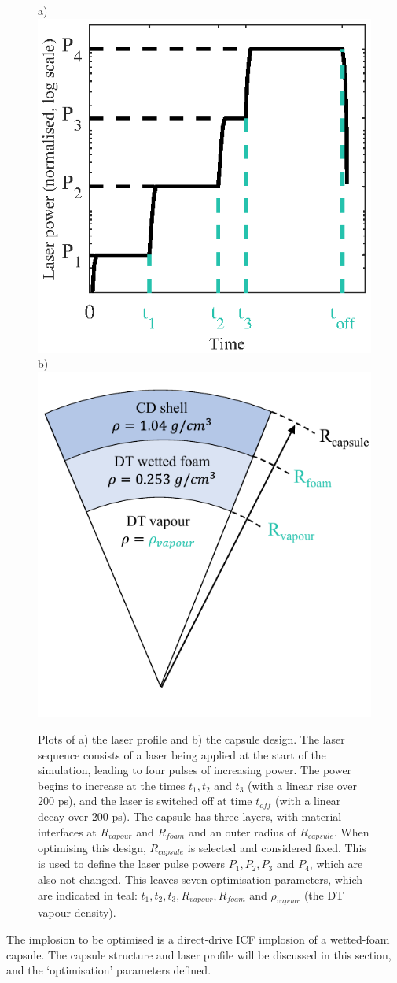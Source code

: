 \begin{figure}
\centering     %
\subfigure a){\label{fig:LaserProfile}\includegraphics[width=.45\textwidth]{figures/LowCR/LaserProfile_half.eps}}
\subfigure b){\label{fig:CapsuleDesign}\includegraphics[width=.45\textwidth]{figures/LowCR/Capsule.pdf}}
\caption{Plots of a) the laser profile and b) the capsule design. The laser sequence consists of a laser being applied at the start of the simulation, leading to four pulses of increasing power. The power begins to increase at the times $t_1, t_2$ and $t_3$ (with a linear rise over 200 \unit{\pico\second}), and the laser is switched off at time $t_{off}$ (with a linear decay over 200 \unit{\pico\second}). The capsule has three layers, with material interfaces at  $R_{vapour}$ and $R_{foam}$ and an outer radius of $R_{capsule}$. When optimising this design, $R_{capsule}$ is selected and considered fixed. This is used to define the laser pulse powers $P_1, P_2, P_3$ and $P_4$, which are also not changed. This leaves seven optimisation parameters, which are indicated in teal: $t_1, t_2, t_3, R_{vapour}, R_{foam}$ and $\rho_{vapour}$ (the DT vapour density).}
\end{figure}

The implosion to be optimised is a direct-drive ICF implosion of a wetted-foam capsule. The capsule structure and laser profile will be discussed in this section, and the `optimisation' parameters defined. 

